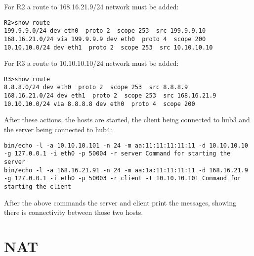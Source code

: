 {{For R2 a route to 168.16.21.9/24 network must be added:
\lstset{language=TeX, caption=R2 routing table}
\begin{lstlisting}
R2>show route  
199.9.9.0/24 dev eth0  proto 2  scope 253  src 199.9.9.10 
168.16.21.0/24 via 199.9.9.9 dev eth0  proto 4  scope 200 
10.10.10.0/24 dev eth1  proto 2  scope 253  src 10.10.10.10
\end{lstlisting}

For R3 a route to 10.10.10.10/24 network must be added:
\lstset{language=TeX, caption=R3 routing table}
\begin{lstlisting}
R3>show route  
8.8.8.0/24 dev eth0  proto 2  scope 253  src 8.8.8.9 
168.16.21.0/24 dev eth1  proto 2  scope 253  src 168.16.21.9 
10.10.10.0/24 via 8.8.8.8 dev eth0  proto 4  scope 200
\end{lstlisting}

After these actions, the hosts are started, the client being connected to hub3 and the server being connected to hub4:
\lstset{language=TeX, caption=Commands issued for starting client and server}
\begin{lstlisting}
bin/echo -l -a 10.10.10.101 -n 24 -m aa:11:11:11:11:11 -d 10.10.10.10 -g 127.0.0.1 -i eth0 -p 50004 -r server Command for starting the server
bin/echo -l -a 168.16.21.91 -n 24 -m aa:1a:11:11:11:11 -d 168.16.21.9 -g 127.0.0.1 -i eth0 -p 50003 -r client -t 10.10.10.101 Command for starting the client
\end{lstlisting}
After the above commands the server and client print the messages, showing there is connectivity between those two hosts.
\section{NAT}
\label{sub-sec:nat-impl}

}}
